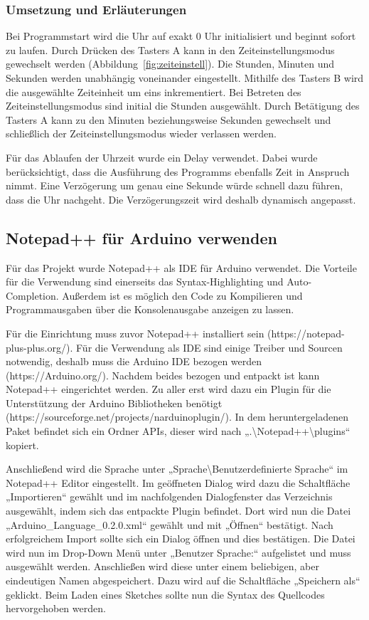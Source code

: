 \subsubsection{Umsetzung und Erläuterungen}
Bei Programmstart wird die Uhr auf exakt 0 Uhr initialisiert und beginnt sofort zu laufen. Durch Drücken des Tasters A kann in den Zeiteinstellungsmodus gewechselt werden  (Abbildung~\ref{fig:zeiteinstell}). Die Stunden, Minuten und Sekunden werden unabhängig voneinander eingestellt. Mithilfe des Tasters B wird die ausgewählte Zeiteinheit um eins inkrementiert. Bei Betreten des Zeiteinstellungsmodus sind initial die Stunden ausgewählt. Durch Betätigung des Tasters A kann zu den Minuten beziehungsweise Sekunden gewechselt und schließlich der Zeiteinstellungsmodus wieder verlassen werden.

Für das Ablaufen der Uhrzeit wurde ein Delay verwendet. Dabei wurde berücksichtigt, dass die Ausführung des Programms ebenfalls Zeit in Anspruch nimmt. Eine Verzögerung um genau eine Sekunde würde schnell dazu führen, dass die Uhr nachgeht. Die Verzögerungszeit wird deshalb dynamisch angepasst.

\subsection{Notepad++ für Arduino verwenden}

Für das Projekt wurde Notepad++ als IDE für Arduino verwendet. Die Vorteile für die Verwendung sind einerseits das Syntax-Highlighting und Auto-Completion. Außerdem ist es möglich den Code zu Kompilieren und Programmausgaben über die Konsolenausgabe anzeigen zu lassen.


Für die Einrichtung muss zuvor Notepad++ installiert sein (https://notepad-plus-plus.org/). Für die Verwendung als IDE sind einige Treiber und Sourcen notwendig, deshalb muss die Arduino IDE bezogen werden (https://Arduino.org/). Nachdem beides bezogen und entpackt ist kann Notepad++ eingerichtet werden. Zu aller erst wird dazu ein Plugin für die Unterstützung der Arduino Bibliotheken benötigt (https://sourceforge.net/projects/narduinoplugin/). In dem heruntergeladenen Paket befindet sich ein Ordner APIs, dieser wird nach „.\textbackslash{}Notepad++\textbackslash{}plugins“ kopiert. 

Anschließend wird die Sprache unter „Sprache\textbackslash{}Benutzerdefinierte Sprache“ im Notepad++ Editor eingestellt. Im geöffneten Dialog wird dazu die Schaltfläche „Importieren“ gewählt und im nachfolgenden Dialogfenster das Verzeichnis ausgewählt, indem sich das entpackte Plugin befindet. Dort wird nun die Datei „Arduino\_Language\_0.2.0.xml“ gewählt und mit „Öffnen“ bestätigt. Nach erfolgreichem Import sollte sich ein Dialog öffnen und dies bestätigen. Die Datei wird nun im Drop-Down Menü unter „Benutzer Sprache:“ aufgelistet und muss ausgewählt werden. Anschließen wird diese unter einem beliebigen, aber eindeutigen Namen abgespeichert. Dazu wird auf die Schaltfläche „Speichern als“ geklickt. Beim Laden eines Sketches sollte nun die Syntax des Quellcodes hervorgehoben werden.


